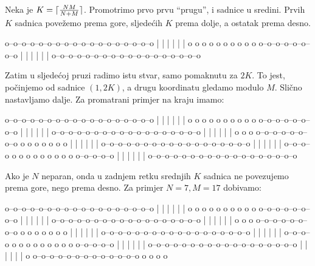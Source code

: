 Neka je $K = \lceil\frac{NM}{N + M}\rceil$. Promotrimo prvo
prvu ``prugu'', i sadnice u sredini. Prvih $K$ sadnica povežemo prema gore,
sljedećih $K$ prema dolje, a ostatak prema desno.

\begin{verbbox}
o--o--o--o--o--o--o--o--o--o--o--o--o--o--o--o--o--o
|  |  |  |  |                                      |
o  o  o  o  o  o  o  o  o  o  o--o--o--o--o--o--o--o
               |  |  |  |  |                       |
o--o--o--o--o--o--o--o--o--o--o--o--o--o--o--o--o--o
\end{verbbox}
\begin{figure}[H]
  \centering
  \theverbbox
\end{figure}

Zatim u sljedećoj pruzi radimo istu stvar, samo pomaknutu za $2K$. To jest,
počinjemo od sadnice $(1, 2K)$, a drugu koordinatu gledamo modulo $M$. Slično
nastavljamo dalje. Za promatrani primjer na kraju imamo:

\begin{verbbox}
o--o--o--o--o--o--o--o--o--o--o--o--o--o--o--o--o--o
|  |  |  |  |                                      |
o  o  o  o  o  o  o  o  o  o  o--o--o--o--o--o--o--o
               |  |  |  |  |                       |
o--o--o--o--o--o--o--o--o--o--o--o--o--o--o--o--o--o
                              |  |  |  |  |        |
o  o  o  o--o--o--o--o--o--o--o  o  o  o  o  o  o  o
|  |  |                                      |  |  |
o--o--o--o--o--o--o--o--o--o--o--o--o--o--o--o--o--o
         |  |  |  |  |                             |
o--o--o--o  o  o  o  o  o  o  o  o  o  o--o--o--o--o
                        |  |  |  |  |              |
o--o--o--o--o--o--o--o--o--o--o--o--o--o--o--o--o--o
\end{verbbox}
\begin{figure}[H]
  \centering
  \theverbbox
\end{figure}

Ako je $N$ neparan, onda u zadnjem retku srednjih $K$ sadnica ne povezujemo
prema gore, nego prema desno. Za primjer $N = 7, M = 17$ dobivamo:

\begin{verbbox}
o--o--o--o--o--o--o--o--o--o--o--o--o--o--o--o--o--o
|  |  |  |  |                                      |
o  o  o  o  o  o  o  o  o  o  o--o--o--o--o--o--o--o
               |  |  |  |  |                       |
o--o--o--o--o--o--o--o--o--o--o--o--o--o--o--o--o--o
                              |  |  |  |  |        |
o  o  o  o--o--o--o--o--o--o--o  o  o  o  o  o  o  o
|  |  |                                      |  |  |
o--o--o--o--o--o--o--o--o--o--o--o--o--o--o--o--o--o
         |  |  |  |  |                             |
o--o--o--o  o  o  o  o  o  o  o  o  o  o--o--o--o--o
                        |  |  |  |  |              |
o--o--o--o--o--o--o--o--o--o--o--o--o--o--o--o--o--o
|                                      |  |  |  |  |
o  o--o--o--o--o--o--o--o--o--o--o--o--o  o  o  o  o
\end{verbbox}
\begin{figure}[H]
  \centering
  \theverbbox
\end{figure}

